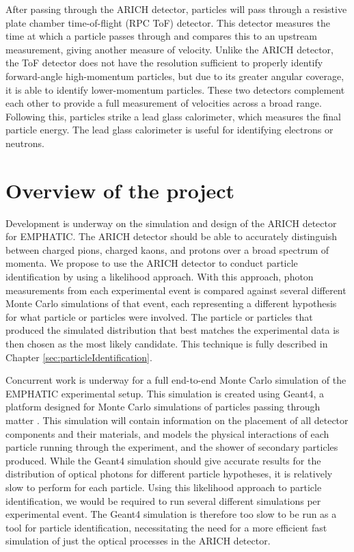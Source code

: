 After passing through the ARICH detector, particles will pass through a resistive plate chamber time-of-flight (RPC ToF) detector.
This detector measures the time at which a particle passes through and compares this to an upstream measurement, giving another measure of velocity. 
Unlike the ARICH detector, the ToF detector does not have the resolution sufficient to properly identify forward-angle high-momentum particles, but due to its greater angular coverage, it is able to identify lower-momentum particles.
These two detectors complement each other to provide a full measurement of velocities across a broad range.
Following this, particles strike a lead glass calorimeter, which measures the final particle energy.
The lead glass calorimeter is useful for identifying electrons or neutrons.

\section{Overview of the project}
Development is underway on the simulation and design of the ARICH detector for EMPHATIC.
The ARICH detector should be able to accurately distinguish between charged pions, charged kaons, and protons over a broad spectrum of momenta.
We propose to use the ARICH detector to conduct particle identification by using a likelihood approach. 
With this approach, photon measurements from each experimental event is compared against several different Monte Carlo simulations of that event, each representing a different hypothesis for what particle or particles were involved.
The particle or particles that produced the simulated distribution that best matches the experimental data is then chosen as the most likely candidate.
This technique is fully described in Chapter \ref{sec:particleIdentification}. 

Concurrent work is underway for a full end-to-end Monte Carlo simulation of the EMPHATIC experimental setup.
This simulation is created using Geant4, a platform designed for Monte Carlo simulations of particles passing through matter \cite{geant4}.
This simulation will contain information on the placement of all detector components and their materials, and models the physical interactions of each particle running through the experiment, and the shower of secondary particles produced.
While the Geant4 simulation should give accurate results for the distribution of optical photons for different particle hypotheses, it is relatively slow to perform for each particle.
Using this likelihood approach to particle identification, we would be required to run several different simulations per experimental event.
The Geant4 simulation is therefore too slow to be run as a tool for particle identification, necessitating the need for a more efficient fast simulation of just the optical processes in the ARICH detector. 


